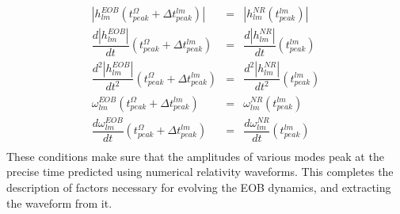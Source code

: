 \documentclass[aps,
prd,
amsmath,
amssymb,
twocolumn,
floatfix,
groupedaddress]{revtex4-1}
\begin{document}
\begin{align}
\left| h^{EOB}_{lm}(t^{\Omega}_{peak}+\Delta t^{lm}_{peak}) \right| &=& \left|h^{NR}_{lm}(t^{lm}_{peak})\right|\\
\dfrac{d\left| h^{EOB}_{lm} \right|}{dt}(t^{\Omega}_{peak}+\Delta t^{lm}_{peak})  &=& \dfrac{d\left|h^{NR}_{lm}\right|}{dt}(t^{lm}_{peak})\\
\dfrac{d^2\left| h^{EOB}_{lm}\right|}{dt^2}(t^{\Omega}_{peak}+\Delta t^{lm}_{peak})  &=& \dfrac{d^2\left|h^{NR}_{lm}\right|}{dt^2}(t^{lm}_{peak})\\
\omega^{EOB}_{lm}(t^{\Omega}_{peak}+\Delta t^{lm}_{peak}) &=& \omega^{NR}_{lm}(t^{lm}_{peak})\\
\dfrac{d\omega^{EOB}_{lm}}{dt}(t^{\Omega}_{peak}+\Delta t^{lm}_{peak})  &=& \dfrac{d\omega^{NR}_{lm}}{dt}(t^{lm}_{peak})\\
\end{align}
These conditions make sure that the amplitudes of various modes peak at the precise time predicted using numerical relativity waveforms. This completes the description of factors necessary for evolving the EOB dynamics, and extracting the waveform from it. 
\end{document}
